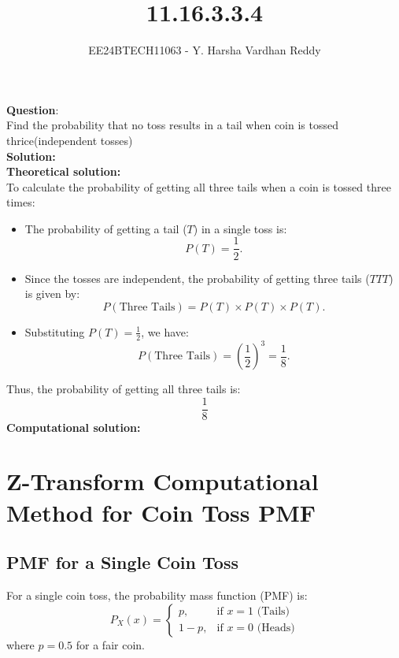 \documentclass[journal]{IEEEtran}
\begin{document}
	
	
	\vspace{3cm}
	
	\title{11.16.3.3.4}
	\author{EE24BTECH11063 - Y. Harsha Vardhan Reddy }
	{\let\newpage\relax\maketitle}
	
	\renewcommand{\thefigure}{\theenumi}
	\renewcommand{\thetable}{\theenumi}
	\setlength{\intextsep}{10pt} %
	
	
	\renewcommand{\thetable}{\theenumi}
	
	
\textbf{Question}:\\
Find the probability that no toss results in a tail when coin is tossed thrice(independent tosses) \\
\textbf{Solution: }\\
\textbf{Theoretical solution: }\\
To calculate the probability of getting all three tails when a coin is tossed three times:

\begin{itemize}
    \item The probability of getting a tail (\(T\)) in a single toss is:
    \[
    P(T) = \frac{1}{2}.
    \]
    \item Since the tosses are independent, the probability of getting three tails (\(TTT\)) is given by:
    \[
    P(\text{Three Tails}) = P(T) \times P(T) \times P(T).
    \]
    \item Substituting \(P(T) = \frac{1}{2}\), we have:
    \[
    P(\text{Three Tails}) = \left(\frac{1}{2}\right)^3 = \frac{1}{8}.
    \]
\end{itemize}

Thus, the probability of getting all three tails is:
\[
\boxed{\frac{1}{8}}
\]
\textbf{Computational solution: }\\


\section*{Z-Transform Computational Method for Coin Toss PMF}
\subsection*{PMF for a Single Coin Toss}
For a single coin toss, the probability mass function (PMF) is:
\[
P_X(x) =
\begin{cases}
p, & \text{if } x = 1 \text{ (Tails)} \\
1-p, & \text{if } x = 0 \text{ (Heads)}
\end{cases}
\]
where \(p = 0.5\) for a fair coin.
\end{document}
